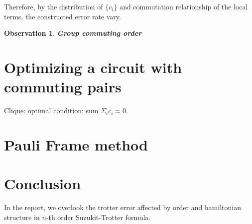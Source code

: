 \documentclass[a4paper,12pt]{article}
\newtheorem{observation}{Observation}
\begin{document}
Therefore, by the distribution of $\{c_i\}$ and commutation relationship of the local terms,
the constructed error rate vary.

\begin{observation} \textbf{Group commuting order}

\end{observation}


\section{Optimizing a circuit with commuting pairs}

Clique: optimal condition: sum $ \Sigma_{i} c_i \approx 0 $.

\section{Pauli Frame method}



\section{Conclusion}

In the report, we overlook the trotter error affected by order and hamiltonian structure 
in $n$-th order Suzukit-Trotter formula.

  
  
\end{document}
